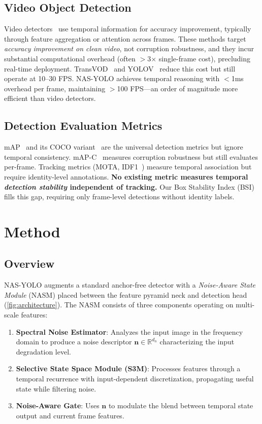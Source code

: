 \documentclass[review]{eccv2026}
\newcommand{\R}{\mathbb{R}}
\begin{document}
\subsection{Video Object Detection}

Video detectors~\cite{fgfa,selsa,mega,troia} use temporal information for accuracy improvement, typically through feature aggregation or attention across frames.
These methods target \textit{accuracy improvement on clean video}, not corruption robustness, and they incur substantial computational overhead (often $>$3$\times$ single-frame cost), precluding real-time deployment.
TransVOD~\cite{transvod} and YOLOV~\cite{yolov} reduce this cost but still operate at 10--30 FPS.
NAS-YOLO achieves temporal reasoning with $<$1ms overhead per frame, maintaining $>$100 FPS---an order of magnitude more efficient than video detectors.

\subsection{Detection Evaluation Metrics}

mAP~\cite{everingham2010pascal} and its COCO variant~\cite{coco} are the universal detection metrics but ignore temporal consistency.
mAP-C~\cite{cococ} measures corruption robustness but still evaluates per-frame.
Tracking metrics (MOTA, IDF1~\cite{mot16}) measure temporal association but require identity-level annotations.
\textbf{No existing metric measures temporal \textit{detection stability} independent of tracking.}
Our Box Stability Index (BSI) fills this gap, requiring only frame-level detections without identity labels.

\section{Method}
\label{sec:method}

\subsection{Overview}

NAS-YOLO augments a standard anchor-free detector with a \textit{Noise-Aware State Module} (NASM) placed between the feature pyramid neck and detection head (\cref{fig:architecture}).
The NASM consists of three components operating on multi-scale features:

\begin{enumerate}[leftmargin=1.5em,topsep=2pt,itemsep=1pt]
  \item \textbf{Spectral Noise Estimator}: Analyzes the input image in the frequency domain to produce a noise descriptor $\bm{n} \in \R^{d_n}$ characterizing the input degradation level.
  \item \textbf{Selective State Space Module (S3M)}: Processes features through a temporal recurrence with input-dependent discretization, propagating useful state while filtering noise.
  \item \textbf{Noise-Aware Gate}: Uses $\bm{n}$ to modulate the blend between temporal state output and current frame features.
\end{enumerate}
\end{document}
